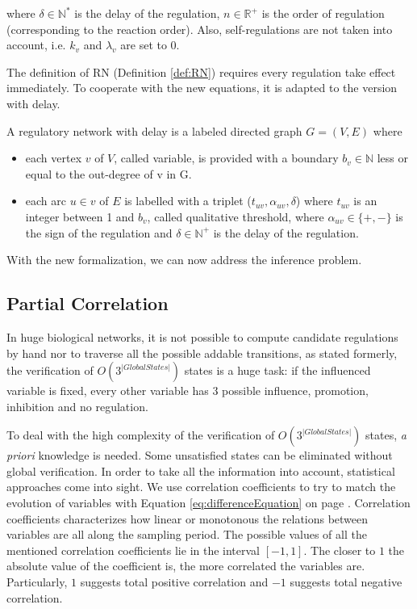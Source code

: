 where $\delta\in \mathbb{N}^{*}$ is the delay of the regulation, $n\in \mathbb{R}^{+}$ is the order of regulation (corresponding to the reaction order).
Also, self-regulations are not taken into account, i.e. $k_v$ and $\lambda_v$ are set to 0.

The definition of RN (Definition \ref{def:RN}) requires every regulation take effect immediately.
To cooperate with the new equations, it is adapted to the version with delay.

\begin{definition}
A regulatory network with delay is a labeled directed graph $G=(V,E)$ where 
\begin{itemize}
    \item each vertex $v$ of $V$, called variable, is provided with a boundary $b_v\in \mathbb{N}$ less or equal to the out-degree of v in G.
    \item each arc $u\in v$ of $E$ is labelled with a triplet ($t_{uv}, \alpha_{uv}, \delta$) where $t_{uv}$ is an integer between 1 and $b_v$, called qualitative threshold, where $\alpha_{uv}\in \{+,-\}$ is the sign of the regulation and $\delta\in \mathbb{N^+}$ is the delay of the regulation.
\end{itemize}
\end{definition}

With the new formalization, we can now address the inference problem.

\subsection{Partial Correlation}

In huge biological networks, it is not possible to compute candidate regulations by hand nor to traverse all the possible addable transitions, as stated formerly, the verification of $O(3^{|Global States|})$ states is a huge task: if the influenced variable is fixed, every other variable has 3 possible influence, promotion, inhibition and no regulation.
 
To deal with the high complexity of the verification of $O(3^{|Global States|})$ states, \textit{a priori} knowledge is needed. 
Some unsatisfied states can be eliminated without global verification.  
In order to take all the information into account, statistical approaches come into sight.
We use correlation coefficients to try to match the evolution of variables with Equation \ref{eq:differenceEquation} on page \pageref{eq:differenceEquation}.
Correlation coefficients characterizes how linear or monotonous the relations between variables are all along the sampling period.
The possible values of all the mentioned correlation coefficients lie in the interval $[-1,1]$.
The closer to $1$ the absolute value of the coefficient is, the more correlated the variables are.
Particularly, $1$ suggests total positive correlation and $-1$ suggests total negative correlation. 


